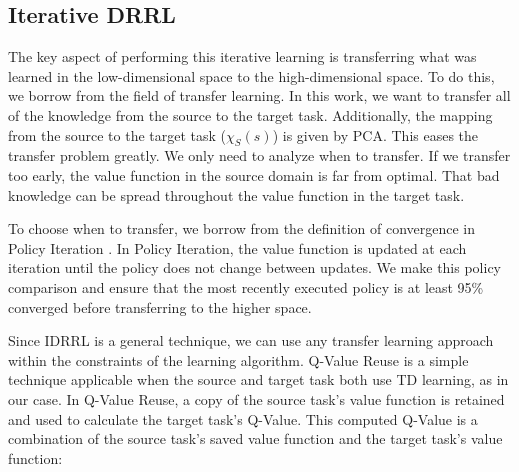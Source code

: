 \documentclass[10pt,a4paper]{article}
\begin{document}


\subsection{Iterative DRRL}


The key aspect of performing this iterative learning is transferring what was learned in the low-dimensional space to the high-dimensional space. To do this, we borrow from the field of transfer learning. In this work, we want to transfer all of the knowledge from the source to the target task. Additionally, the mapping from the source to the target task ($\chi_S(s)$) is given by PCA. This eases the transfer problem greatly. We only need to analyze when to transfer. If we transfer too early, the value function in the source domain is far from optimal. That bad knowledge can be spread throughout the value function in the target task.

To choose when to transfer, we borrow from the definition of convergence in Policy Iteration \cite{Sutton98reinforcementlearning}. In Policy Iteration, the value function is updated at each iteration until the policy does not change between updates. We make this policy comparison and ensure that the most recently executed policy is at least 95\% converged before transferring to the higher space.

Since IDRRL is a general technique, we can use any transfer learning approach within the constraints of the learning algorithm. Q-Value Reuse \cite{AAMAS07-taylor} is a simple technique applicable when the source and target task both use TD learning, as in our case. In Q-Value Reuse, a copy of the source task's value function is retained and used to calculate the target task's Q-Value. This computed Q-Value is a combination of the source task's saved value function and the target task's value function:
\end{document}
